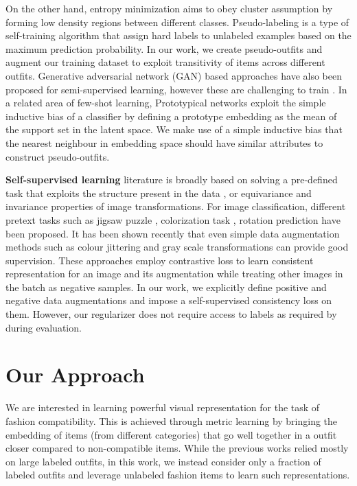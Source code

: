 \documentclass[sigconf]{acmart}
\begin{document}
On the other hand, entropy minimization \cite{kundu2020towards,grandvalet2005semi} aims to obey cluster assumption by forming low density regions between different classes. Pseudo-labeling \cite{lee2013pseudo,cida_eccv,venkat2021classifier} is a type of self-training algorithm that assign hard labels to unlabeled examples based on the maximum prediction probability. In our work, we create pseudo-outfits and augment our training dataset to exploit transitivity of items across different outfits. Generative adversarial network (GAN) \cite{goodfellow2014generative} based approaches have also been proposed for semi-supervised learning, however these are challenging to train \cite{salimans2016improved}. In a related area of few-shot learning, Prototypical networks \cite{snell2017prototypical} exploit the simple inductive bias of a classifier by defining a prototype embedding as the mean of the support set in the latent space. We make use of a simple inductive bias that the nearest neighbour in embedding space should have similar attributes to construct pseudo-outfits. 

\vspace{1mm}
\noindent \textbf{Self-supervised learning} literature is broadly based on solving a pre-defined task that exploits the structure present in the data \cite{moco,simclr,caron2018deep,goyal2019scaling}, or equivariance \cite{noroozi2017representation,kundu2020unsupervised} and invariance \cite{misra2020self} properties of image transformations. For image classification, different pretext tasks such as jigsaw puzzle \cite{noroozi2016unsupervised}, colorization task \cite{deshpande2015learning}, rotation prediction \cite{gidaris2018unsupervised} have been proposed. It has been shown recently that even simple data augmentation methods  \cite{simclr, moco, mocov2} such as colour jittering and gray scale transformations can provide good supervision. These approaches employ contrastive loss to learn consistent representation for an image and its augmentation while treating other images in the batch as negative samples. In our work, we explicitly define positive and negative data augmentations and impose a self-supervised consistency loss on them. However, our regularizer does not require access to labels as required by \cite{moco,simclr} during evaluation.
 

\section{Our Approach}
We are interested in learning powerful visual representation for the task of fashion compatibility. This is achieved through metric learning by bringing the embedding of items (from different categories) that go well together in a outfit closer compared to non-compatible items. While the previous works \cite{eccv2018learning,iccv2019learning,cvpr2020fashion} relied mostly on large labeled outfits, in this work, we instead consider only a fraction of labeled outfits and leverage unlabeled fashion items to learn such representations. 
\end{document}
